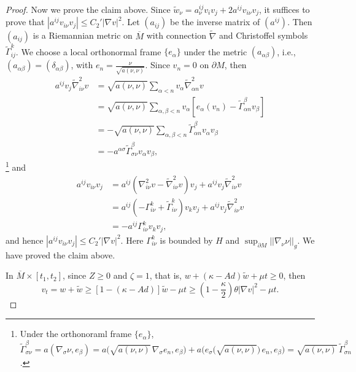 \documentclass[12pt]{amsart}
\theoremstyle{definition}
\theoremstyle{remark}
\numberwithin{equation}{section}
\begin{document}
\begin{proof}
	Now we prove the claim above. Since $\tilde{w}_\nu = a^{ij}_\nu v_i v_j + 2a^{ij} v_{i\nu} v_j$, it suffices to prove that $|a^{ij} v_{i\nu} v_j| \leq C_2' |\nabla v|^2$.
	Let $(a_{ij})$ be the inverse matrix of $(a^{ij})$. Then $(a_{ij})$ is a Riemannian metric on $\overline{M}$ with connection $\tilde{\nabla}$ and Christoffel symbols $\tilde{\Gamma}^k_{ij}$. We choose a local orthonormal frame $\{ e_\alpha \}$ under the metric $(a_{\alpha\beta})$, i.e., $(a_{\alpha\beta}) = (\delta_{\alpha\beta})$, with $e_n = \frac{\nu}{\sqrt{a(\nu, \nu)}}$. Since $v_n = 0$ on $\partial M$, then 
	\begin{equation}
	\begin{aligned}
	a^{ij} v_j \tilde{\nabla}^2_{i\nu} v &= \sqrt{a(\nu, \nu)} \sum_{\alpha < n} v_\alpha \tilde{\nabla}^2_{\alpha n} v\\
	&= \sqrt{a(\nu, \nu)} \sum_{\alpha, \beta < n} v_\alpha [e_\alpha (v_n) - \tilde{\Gamma}^\beta_{\alpha n} v_\beta]\\
	&= - \sqrt{a(\nu, \nu)} \sum_{\alpha, \beta < n} \tilde{\Gamma}^\beta_{\alpha n} v_\alpha v_\beta\\
	&= - a^{\alpha\sigma}\tilde{\Gamma}^{\beta}_{\sigma\nu}v_\alpha v_\beta,
	\end{aligned}
	\end{equation}
	\footnote{Under the orthonoraml frame $\{e_\alpha\}$, $\tilde{\Gamma}_{\sigma\nu}^\beta = a(\nabla_\sigma \nu, e_\beta) = a\Big( \sqrt{a(\nu, \nu)}\, \nabla_\sigma e_n, e_\beta \Big) + a\Big( e_\sigma\big(\sqrt{a(\nu, \nu)}\big)\, e_n, e_\beta\Big) = \sqrt{a(\nu, \nu)}\, \tilde{\Gamma}_{\sigma n}^\beta$.}
	and
	\begin{equation}
	\begin{aligned}
	a^{ij}v_{i\nu}v_j &= a^{ij}(\nabla^2_{i\nu}v - \tilde{\nabla}^2_{i\nu}v) v_j + a^{ij} v_j \tilde{\nabla}^2_{i\nu} v \\
	& = a^{ij}(- \Gamma_{i\nu}^k + \tilde{\Gamma}_{i\nu}^k) v_k v_j + a^{ij} v_j \tilde{\nabla}^2_{i\nu} v\\
	&= - a^{ij} \Gamma_{i\nu}^k v_k v_j,
	\end{aligned}
	\end{equation}
	and hence $|a^{ij} v_{i\nu} v_j| \leq C_2' |\nabla v|^2$. Here $\Gamma_{i\nu}^k$ is bounded by $H$ and $\sup_{\partial M}||\nabla_\nu \nu||_g$. We have proved the claim above.
	
	In $\overline{M} \times [t_1, t_2]$, since $Z \geq 0$ and $\zeta = 1$, that is, $w + (\kappa - Ad)\tilde{w} + \mu t \geq 0$, then
	\begin{equation}\label{Harn_ineq_8}
	v_t = w + \tilde{w} \geq [1 - (\kappa - Ad)] \tilde{w} - \mu t \geq (1 - \frac{\kappa}{2})\theta |\nabla v|^2 - \mu t.
	\end{equation}
	

\end{proof}
\end{document}
